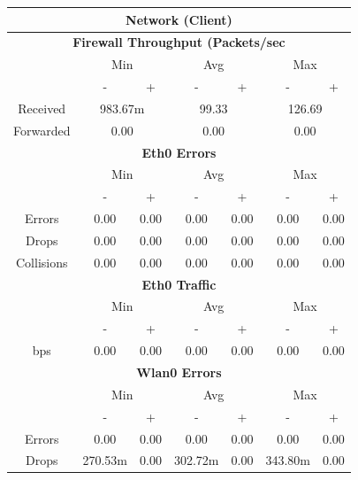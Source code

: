 \documentclass[11pt,a4paper]{scrreprt}
\begin{document}
\begin{table}[H]
\centering
    \begin{tabular}{||c|c|c|c|c|c|c||}
    \hline
    \multicolumn{7}{|c|}{\textbf{Network (Client)}} \\
    \hline
    \multicolumn{7}{|c|}{\textbf{Firewall Throughput (Packets/sec}} \\
    \hline\hline
      & \multicolumn{2}{|c|}{Min} & \multicolumn{2}{|c|}{Avg} & \multicolumn{2}{|c|}{Max} \\
    \hline\hline
      & - & + & - & + & - & + \\
    \hline
    Received & \multicolumn{2}{|c|}{983.67m} & \multicolumn{2}{|c|}{99.33} & \multicolumn{2}{|c|}{126.69} \\
    \hline
    Forwarded & \multicolumn{2}{|c|}{0.00} & \multicolumn{2}{|c|}{0.00} & \multicolumn{2}{|c|}{0.00} \\
    \hline\hline
    \multicolumn{7}{|c|}{\textbf{Eth0 Errors}} \\
    \hline\hline
      & \multicolumn{2}{|c|}{Min} & \multicolumn{2}{|c|}{Avg} & \multicolumn{2}{|c|}{Max} \\
    \hline
     & - & + & - & + & - & + \\
    \hline
    Errors & 0.00 & 0.00 & 0.00 & 0.00 & 0.00 & 0.00 \\
    \hline
    Drops & 0.00 & 0.00 & 0.00 & 0.00 & 0.00 & 0.00 \\
    \hline
    Collisions & 0.00 & 0.00 & 0.00 & 0.00 & 0.00 & 0.00 \\
    \hline\hline
    \multicolumn{7}{|c|}{\textbf{Eth0 Traffic}} \\
    \hline\hline
      & \multicolumn{2}{|c|}{Min} & \multicolumn{2}{|c|}{Avg} & \multicolumn{2}{|c|}{Max} \\
    \hline
      & - & + & - & + & - & + \\
    \hline
    bps & 0.00 & 0.00 & 0.00 & 0.00 & 0.00 & 0.00 \\
    \hline\hline
    \multicolumn{7}{|c|}{\textbf{Wlan0 Errors}} \\
    \hline\hline
      & \multicolumn{2}{|c|}{Min} & \multicolumn{2}{|c|}{Avg} & \multicolumn{2}{|c|}{Max} \\
    \hline
      & - & + & - & + & - & + \\
    \hline
    Errors  & 0.00 & 0.00 & 0.00 & 0.00 & 0.00 & 0.00 \\
    \hline
    Drops & 270.53m & 0.00 & 302.72m & 0.00 & 343.80m & 0.00 \\

\end{tabular}
\end{table}
\end{document}
